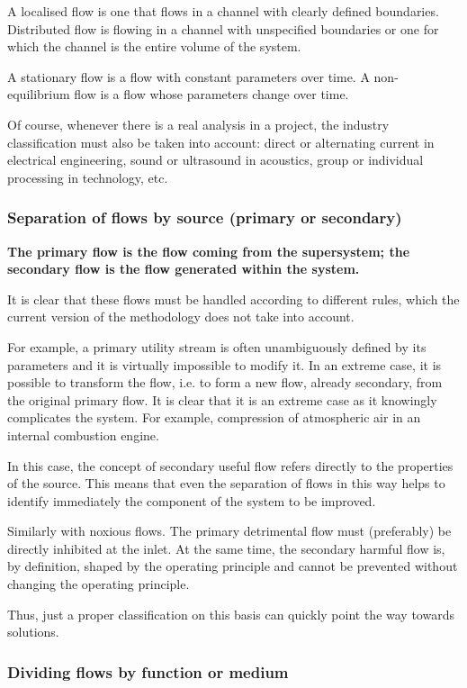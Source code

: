 \documentclass[a4paper,11pt]{article}
\begin{document}
A localised flow is one that flows in a channel with clearly defined
boundaries. Distributed flow is flowing in a channel with unspecified
boundaries or one for which the channel is the entire volume of the system.

A stationary flow is a flow with constant parameters over time.  A
non-equilibrium flow is a flow whose parameters change over time.

Of course, whenever there is a real analysis in a project, the industry
classification must also be taken into account: direct or alternating current
in electrical engineering, sound or ultrasound in acoustics, group or
individual processing in technology, etc.

\subsubsection{Separation of flows by source (primary or secondary)}

\textbf{The primary flow is the flow coming from the supersystem; the
  secondary flow is the flow generated within the system.}

It is clear that these flows must be handled according to different rules,
which the current version of the methodology does not take into account.

For example, a primary utility stream is often unambiguously defined by its
parameters and it is virtually impossible to modify it. In an extreme case, it
is possible to transform the flow, i.e. to form a new flow, already secondary,
from the original primary flow. It is clear that it is an extreme case as it
knowingly complicates the system. For example, compression of atmospheric air
in an internal combustion engine.

In this case, the concept of secondary useful flow refers directly to the
properties of the source. This means that even the separation of flows in this
way helps to identify immediately the component of the system to be improved.

Similarly with noxious flows. The primary detrimental flow must (preferably)
be directly inhibited at the inlet. At the same time, the secondary harmful
flow is, by definition, shaped by the operating principle and cannot be
prevented without changing the operating principle.

Thus, just a proper classification on this basis can quickly point the way
towards solutions.

\subsubsection{Dividing flows by function or medium}
\end{document}
